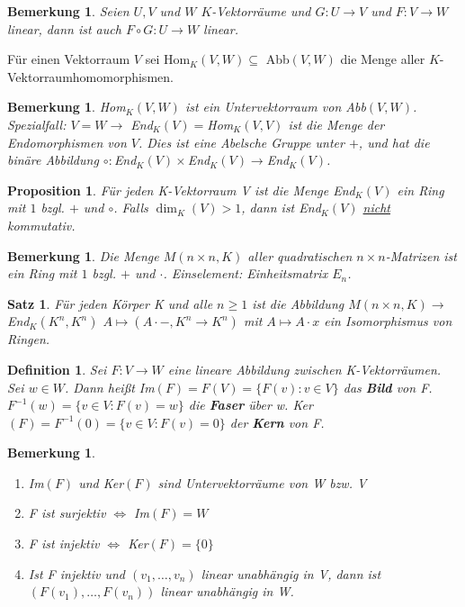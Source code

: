 \documentclass[12pt,a4paper]{article}
\theoremstyle{plain}
\newtheorem{Satz}[Theorem]{Satz}
\newtheorem{Prop}[Theorem]{Proposition}
\newtheorem{Definition}[Theorem]{Definition}
\newtheorem{Bemerkung}[Theorem]{Bemerkung}
\newcommand{\herv}[1]{{\emph{\textbf{#1}}}}
\numberwithin{equation}{section}
\begin{document}
\begin{Bemerkung}
Seien $U,V$ und $W$ $K$-Vektorräume und $G:U\rightarrow V$ und $F:V \rightarrow W$ linear, dann ist auch $F\circ G:U\rightarrow W$ linear.
\end{Bemerkung}
Für einen Vektorraum $V$ sei Hom$_K(V,W)\subseteq$ Abb$(V,W)$ die Menge aller $K$-Vektorraumhomomorphismen.
\begin{Bemerkung}
Hom$_K(V,W)$ ist ein Untervektorraum von Abb$(V,W)$.\\
Spezialfall: $V=W \rightarrow$ End$_K(V)=$Hom$_K(V,V)$ ist die Menge der Endomorphismen von $V$. Dies ist eine Abelsche Gruppe unter $+$, und hat die binäre Abbildung $\circ: $End$_K(V)\times$End$_K(V) \rightarrow$End$_K(V)$. 
\end{Bemerkung}
\begin{Prop}
Für jeden K-Vektorraum V ist die Menge \emph{End}$_K(V)$ ein Ring mit $1$ bzgl. $+$ und $\circ$. Falls $\dim_K(V)>1$, dann ist \emph{End}$_K(V)$ \underline{nicht} kommutativ.
\end{Prop}
\begin{Bemerkung}
Die Menge $M(n\times n, K)$ aller quadratischen $n\times n$-Matrizen ist ein Ring mit $1$ bzgl. $+$ und $\cdot$. Einselement: Einheitsmatrix $E_n$.
\end{Bemerkung}
\begin{Satz}
Für jeden Körper K und alle $n\geq 1$ ist die Abbildung $M(n\times n, K)\rightarrow $\emph{End}$_K(K^n,K^n)$ $A\mapsto (A\cdot -, K^n \rightarrow K^n)$ mit $A\mapsto A\cdot x$ ein Isomorphismus von Ringen.
\end{Satz}
\begin{Definition}
Sei $F:V\rightarrow W$ eine lineare Abbildung zwischen K-Vektorräumen. Sei $w\in W$. Dann heißt \emph{Im}$(F)=F(V)=\{F(v):v\in V\}$ das \herv{Bild} von F. $F^{-1}(w)=\{v\in V: F(v)=w\}$ die \herv{Faser} über w. \emph{Ker}$(F)=F^{-1}(0)=\{v\in V: F(v)=0\}$ der \herv{Kern} von F.
\end{Definition}
\begin{Bemerkung}
\begin{enumerate}
\renewcommand{\labelenumi}{\emph{\alph{enumi})}}
\item Im$(F)$ und Ker$(F)$ sind Untervektorräume von W bzw. V 
\item F ist surjektiv $\Leftrightarrow$ Im$(F)=W$ 
\item F ist injektiv $\Leftrightarrow$ Ker$(F)=\{0\}$
\item Ist F injektiv und $(v_1,\ldots,v_n)$ linear unabhängig in V, dann ist $(F(v_1),\ldots,F(v_n))$ linear unabhängig in W.
\end{enumerate}
\end{Bemerkung}
\end{document}
